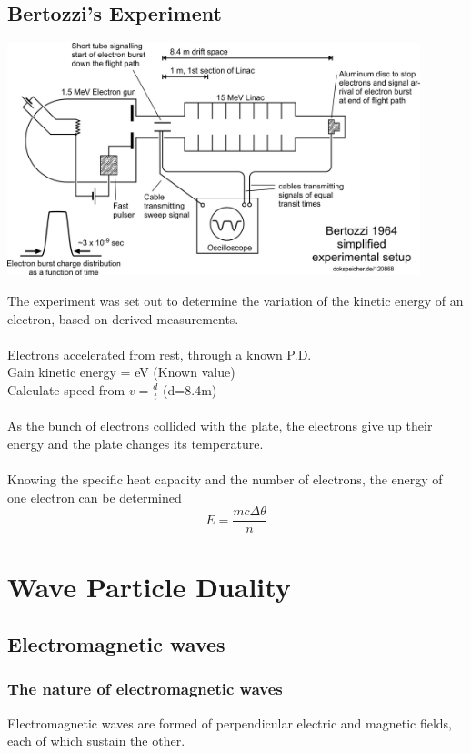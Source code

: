 \documentclass[12pt]{article}
\begin{document}
\subsection{Bertozzi's Experiment}
\begin{center}
\includegraphics[width=12cm]{Bertozzi.jpg}
\end{center}
The experiment was set out to determine the variation of the kinetic energy of an electron, based on derived measurements.\\
\\
Electrons accelerated from rest, through a known P.D.\\
Gain kinetic energy = eV (Known value)\\
Calculate speed from $v=\frac{d}{t}$ (d=8.4m)\\
\\
As the bunch of electrons collided with the plate, the electrons give up their energy and the plate changes its temperature.\\
\\
Knowing the specific heat capacity and the number of electrons, the energy of one electron can be determined
$$E=\frac{mc\Delta\theta}{n}$$
\section{Wave Particle Duality}
\subsection{Electromagnetic waves}
\subsubsection{The nature of electromagnetic waves}
Electromagnetic waves are formed of perpendicular electric and magnetic fields, each of which sustain the other.\\
\end{document}
